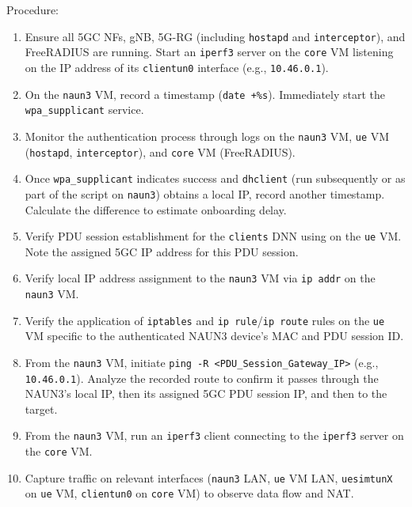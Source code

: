 Procedure:
\begin{enumerate}
    \item Ensure all \ac{5GC} \acp{NF}, \ac{gNB}, \ac{5G-RG} (including \texttt{hostapd} and \texttt{interceptor}), and FreeRADIUS are running. Start an \texttt{iperf3} server on the \texttt{core} \ac{VM} listening on the \ac{IP} address of its \texttt{clientun0} interface (e.g., \texttt{10.46.0.1}).

    \item On the \texttt{naun3} \ac{VM}, record a timestamp (\texttt{date +\%s}). Immediately start the \texttt{wpa\_supplicant} service.

    \item Monitor the authentication process through logs on the \texttt{naun3} \ac{VM}, \texttt{ue} \ac{VM} (\texttt{hostapd}, \texttt{interceptor}), and \texttt{core} \ac{VM} (FreeRADIUS).

    \item Once \texttt{wpa\_supplicant} indicates success and \texttt{dhclient} (run subsequently or as part of the script on \texttt{naun3}) obtains a local \ac{IP}, record another timestamp. Calculate the difference to estimate onboarding delay.
    
    \item Verify \ac{PDU} session establishment for the \texttt{clients} \ac{DNN} using  on the \texttt{ue} \ac{VM}. Note the assigned \ac{5GC} \ac{IP} address for this \ac{PDU} session.
    
    \item Verify local \ac{IP} address assignment to the \texttt{naun3} \ac{VM} via \texttt{ip addr} on the \texttt{naun3} \ac{VM}.
    
    \item Verify the application of \texttt{iptables} and \texttt{ip rule}/\texttt{ip route} rules on the \texttt{ue} \ac{VM} specific to the authenticated \ac{NAUN3} device's \ac{MAC} and \ac{PDU} session ID.
    
    \item From the \texttt{naun3} \ac{VM}, initiate \texttt{ping -R <PDU\_Session\_Gateway\_IP>} (e.g., \texttt{10.46.0.1}). Analyze the recorded route to confirm it passes through the \ac{NAUN3}'s local \ac{IP}, then its assigned \ac{5GC} \ac{PDU} session \ac{IP}, and then to the target.
    
    \item From the \texttt{naun3} \ac{VM}, run an \texttt{iperf3} client connecting to the \texttt{iperf3} server on the \texttt{core} \ac{VM}.
    
    \item Capture traffic on relevant interfaces (\texttt{naun3} \ac{LAN}, \texttt{ue} \ac{VM} \ac{LAN}, \texttt{uesimtunX} on \texttt{ue} \ac{VM}, \texttt{clientun0} on \texttt{core} \ac{VM}) to observe data flow and \ac{NAT}.
\end{enumerate}

